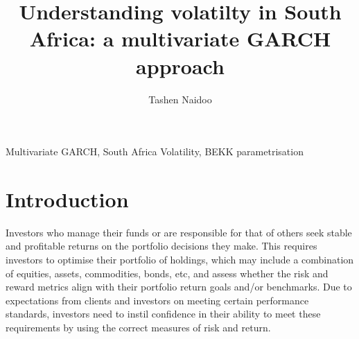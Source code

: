 \documentclass[11pt,preprint, authoryear]{elsarticle}
\numberwithin{equation}{section}
\numberwithin{figure}{section}
\numberwithin{table}{section}
\begin{document}
\begin{frontmatter}  %

\title{Understanding volatilty in South Africa: a multivariate GARCH
approach}





\author[Add1]{Tashen Naidoo}





\address[Add1]{Stellenbosch University, Cape Town, South Africa}



\vspace{1cm}


\begin{keyword}
\footnotesize{
Multivariate GARCH, South Africa Volatility, BEKK parametrisation \\
\vspace{0.3cm}
}
\end{keyword}



\vspace{0.5cm}

\end{frontmatter}

\setcounter{footnote}{0}



\pagestyle{fancy}
\chead{}
\rhead{}
\lfoot{}
\lhead{}
\cfoot{}


\headsep 35pt %




\hypertarget{introduction}{%
\section{Introduction}\label{introduction}}

Investors who manage their funds or are responsible for that of others
seek stable and profitable returns on the portfolio decisions they make.
This requires investors to optimise their portfolio of holdings, which
may include a combination of equities, assets, commodities, bonds, etc,
and assess whether the risk and reward metrics align with their
portfolio return goals and/or benchmarks. Due to expectations from
clients and investors on meeting certain performance standards,
investors need to instil confidence in their ability to meet these
requirements by using the correct measures of risk and return.
\end{document}
